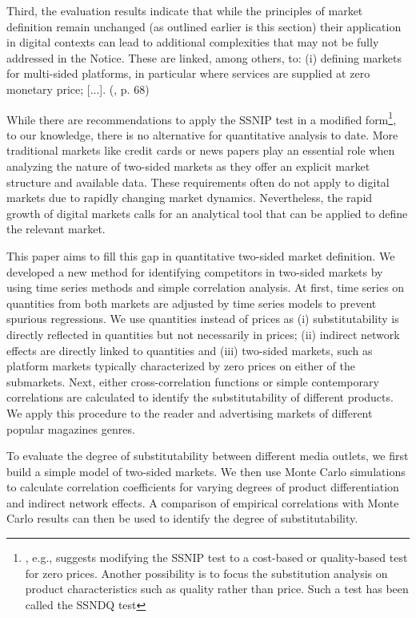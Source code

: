 \documentclass[12pt,a4paper,notitlepage]{article}
\begin{document}
\begin{displayquote}
Third, the evaluation results indicate that while the principles of market definition remain unchanged (as outlined earlier is this section) their application in digital contexts can lead to additional complexities that may not be fully addressed in the Notice. These are linked, among others, to: (i) defining markets for multi-sided platforms, in particular where services are supplied at zero monetary price; [...]. (\citet{europeancommission_evaluation_2021}, p. 68)
\end{displayquote}

While there are recommendations to apply the SSNIP test in a modified form\footnote{\citet{newman_antitrust_2015}, e.g., suggests modifying the SSNIP test to a cost-based or quality-based test for zero prices. Another possibility is to focus the substitution analysis on product characteristics such as quality rather than price. Such a test has been called the SSNDQ test}, to our knowledge, there is no alternative for quantitative analysis to date. More traditional markets like credit cards or news papers play an essential role when analyzing the nature of two-sided markets as they offer an explicit market structure and available data. These requirements often do not apply to digital markets due to rapidly changing market dynamics. Nevertheless, the rapid growth of digital markets calls for an analytical tool that can be applied to define the relevant market.

This paper aims to fill this gap in quantitative two-sided market definition. We developed a new method for identifying competitors in two-sided markets by using time series methods and simple correlation analysis. At first, time series on quantities from both markets are adjusted by time series models to prevent spurious regressions. We use quantities instead of prices as (i) substitutability is directly reflected in quantities but not necessarily in prices; (ii) indirect network effects are directly linked to quantities and (iii) two-sided markets, such as platform markets typically characterized by zero prices on either of the submarkets. Next, either cross-correlation functions or simple contemporary correlations are calculated to identify the substitutability of different products. We apply this procedure to the reader and advertising markets of different popular magazines genres. 

To evaluate the degree of substitutability between different media outlets, we first build a simple model of two-sided markets. We then use Monte Carlo simulations to calculate correlation coefficients for varying degrees of product differentiation and indirect network effects. A comparison of empirical correlations with Monte Carlo results can then be used to identify the degree of substitutability. 
\end{document}
